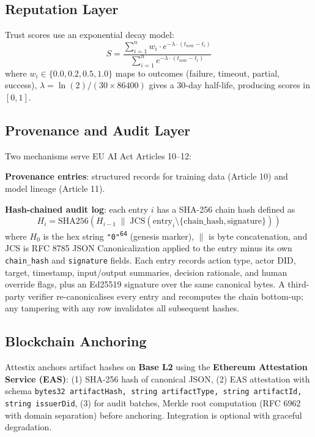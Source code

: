 \documentclass[conference]{IEEEtran}
\begin{document}
\subsection{Reputation Layer}

Trust scores use an exponential decay model:
\begin{equation}
S = \frac{\sum_{i=1}^{n} w_i \cdot e^{-\lambda \cdot (t_{now} - t_i)}}{\sum_{i=1}^{n} e^{-\lambda \cdot (t_{now} - t_i)}}
\end{equation}
where $w_i \in \{0.0, 0.2, 0.5, 1.0\}$ maps to outcomes (failure, timeout, partial, success), $\lambda = \ln(2) / (30 \times 86400)$ gives a 30-day half-life, producing scores in $[0, 1]$.

\subsection{Provenance and Audit Layer}

Two mechanisms serve EU AI Act Articles 10--12:

\textbf{Provenance entries}: structured records for training data (Article 10) and model lineage (Article 11).

\textbf{Hash-chained audit log}: each entry $i$ has a SHA-256 chain hash defined as
\begin{equation}
H_i = \text{SHA256}(H_{i-1} \; \| \; \text{JCS}(\text{entry}_i \setminus \{\text{chain\_hash}, \text{signature}\}))
\end{equation}
where $H_0$ is the hex string \texttt{"0"\textsuperscript{64}} (genesis marker), $\|$ is byte concatenation, and $\text{JCS}$ is RFC 8785 JSON Canonicalization applied to the entry minus its own \texttt{chain\_hash} and \texttt{signature} fields. Each entry records action type, actor DID, target, timestamp, input/output summaries, decision rationale, and human override flags, plus an Ed25519 signature over the same canonical bytes. A third-party verifier re-canonicalises every entry and recomputes the chain bottom-up; any tampering with any row invalidates all subsequent hashes.

\subsection{Blockchain Anchoring}

Attestix anchors artifact hashes on \textbf{Base L2} using the \textbf{Ethereum Attestation Service (EAS)}: (1) SHA-256 hash of canonical JSON, (2) EAS attestation with schema \texttt{bytes32 artifactHash, string artifactType, string artifactId, string issuerDid}, (3) for audit batches, Merkle root computation (RFC 6962 with domain separation) before anchoring. Integration is optional with graceful degradation.
\end{document}
